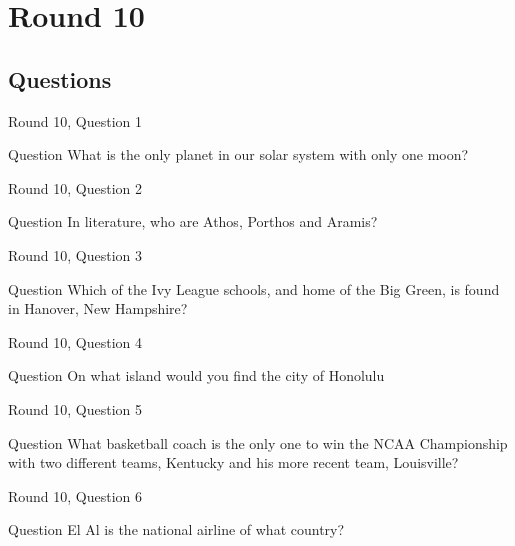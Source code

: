 \documentclass[11pt]{beamer}
\begin{document}
\section{Round 10}
    
\subsection{Questions}

\begin{frame}{Round 10, Question 1}
\begin{block}{Question}
What is the only planet in our solar system with only one moon\@?
\end{block}
\end{frame}
    

\begin{frame}{Round 10, Question 2}
\begin{block}{Question}
In literature, who are Athos, Porthos and Aramis\@?
\end{block}
\end{frame}
    

\begin{frame}{Round 10, Question 3}
\begin{block}{Question}
Which of the Ivy League schools, and home of the Big Green, is found in Hanover, New Hampshire\@?
\end{block}
\end{frame}
    

\begin{frame}{Round 10, Question 4}
\begin{block}{Question}
On what island would you find the city of Honolulu
\end{block}
\end{frame}
    

\begin{frame}{Round 10, Question 5}
\begin{block}{Question}
What basketball coach is the only one to win the NCAA Championship with two different teams, Kentucky and his more recent team, Louisville\@?
\end{block}
\end{frame}
    

\begin{frame}{Round 10, Question 6}
\begin{block}{Question}
El Al is the national airline of what country\@?
\end{block}
\end{frame}
    
\end{document}
